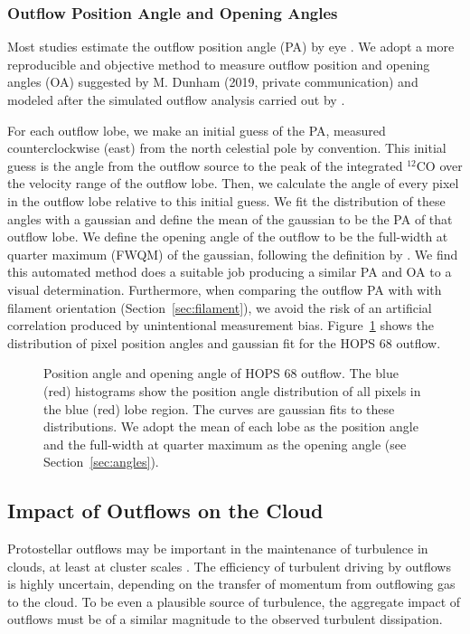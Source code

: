 \documentclass[twocolumn]{aastex63}
\newcommand{\example}{HOPS 68}
\newcommand{\co}[1][]{\ensuremath{^{#1}}CO}
\begin{document}
\subsubsection{Outflow Position Angle and Opening Angles\label{sec:angles}}
Most studies estimate the outflow position angle (PA) by eye \citep[e.g.][]{Morgan91,Takahashi08,Plunkett13,Stephens17,Kong19,Tanabe:submitted}. We adopt a more reproducible and objective method to measure outflow position and opening angles (OA)  suggested by M. Dunham (2019, private communication) and modeled after the simulated outflow analysis carried out by \citet{Offner11}.

For each outflow lobe, we make an initial guess of the PA, measured counterclockwise (east) from the north celestial pole by convention. This initial guess is the angle from the outflow source to the peak of the integrated \co[12]{} over the velocity range of the outflow lobe. Then, we calculate the angle of every pixel in the outflow lobe relative to this initial guess. We fit the distribution of these angles with a gaussian and define the mean of the gaussian to be the PA of that outflow lobe. We define the opening angle of the outflow to be the full-width at quarter maximum (FWQM) of the gaussian, following the definition by \cite{Offner11}. We find this automated method does a suitable job producing a similar PA and OA to a visual determination. Furthermore, when comparing the outflow PA with with filament orientation (Section~\ref{sec:filament}), we avoid the risk of an artificial correlation produced by unintentional measurement bias. Figure~\ref{fig:angles} shows the distribution of pixel position angles and gaussian fit for the \example{} outflow.

\begin{figure}
\caption{Position angle and opening angle of \example{} outflow. The blue (red) histograms show the position angle distribution of all pixels in the blue (red) lobe region. The curves are gaussian fits to these distributions. We adopt the mean of each lobe as the position angle and the full-width at quarter maximum as the opening angle (see Section~\ref{sec:angles}).\label{fig:angles}}
\end{figure}


\subsection{Impact of Outflows on the Cloud}\label{sec:impact}
Protostellar outflows may be important in the maintenance of turbulence in clouds, at least at cluster scales \citep{Nakamura07}. The efficiency of turbulent driving by outflows is highly uncertain, depending on the transfer of momentum from outflowing gas to the cloud. To be even a plausible source of turbulence, the aggregate impact of outflows must be of a similar magnitude to the observed turbulent dissipation.
\end{document}
